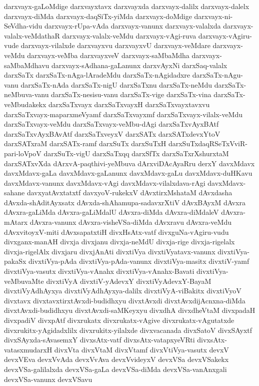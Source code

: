 {darxvayx-gaLoMdige
darxvayxtavx
darxvayxda
darxvayx-dalilx
darxvayx-dalelx
darxvayx-diMda
darxvayx-daqSiTx-yiMda
darxvayx-doMdige
darxvayx-ni-SeVdha-vidu
darxvayx-rUpa-vAda
darxvayx-vanunx
darxvayx-valalxda
darxvayx-valalx-veMdathaR
darxvayx-valalx-veMdu
darxvayx-vAgi-ruva
darxvayx-vAgiru-vude
darxvayx-vilalxde
darxvayxvu
darxvayxvU
darxvayx-veMdare
darxvayx-veMdu
darxvayx-veMba
darxvayxveV
darxvayx-saMbaMdha
darxvayx-saMbaMdhavu
darxvayx-sAdhana-gaLanunx
darxvAyxNi
darxSaq-valalx
darxSaTx
darxSaTx-nAga-lAradeMdu
darxSaTx-nAgidadxre
darxSaTx-nAgu-vanu
darxSaTx-nAda
darxSaTx-nigU
darxSaTxnu
darxSaTx-neMdu
darxSaTx-neMbuva-vanu
darxSaTx-nesisu-vanu
darxSaTx-vige
darxSaTx-vina
darxSaTx-veMbudakekx
darxSaTxvayx
darxSaTxvayxH
darxSaTxvayxtavxvu
darxSaTxvayx-maparxmeVyamf
darxSaTxvayxmf
darxSaTxvayx-vilalx-veMdu
darxSaTxvayx-veMdu
darxSaTxvayx-veMbu-dAgi
darxSaTxvAyxBAtf
darxSaTxvAyxBAvAtf
darxSaTxveyxV
darxSATx
darxSATxdevxYtoV
darxSATxraM
darxSATx-ramf
darxSuTx
darxSuTxH
darxSuTxdaqRSeTxVviR-pari-loVpoV
darxSuTx-vigU
darxSaTxqq
darxSfTx
darxSaTxrXshurxtaM
darxSATxvXda
dArxvA-paqthivi-yeMbuva
dArxviDAcAyaRru
derxY
davxMdavx
davxMdavx-gaLa
davxMdavx-gaLanunx
davxMdavx-gaLu
davxMdavx-duHKavu
davxMdavx-vanunx
davxMdavx-vAgi
davxMdavx-vilalxdava-rAgi
davxMdavx-sahane
davxyatAvxtatxtf
davxyoV-rukekxV
dAvxtirxMshataM
dAvxdasha
dAvxda-shAditAyxsatx
dAvxda-shAhamupa-sadavxrXtiV
dAvxBAyxM
dAvxra
dAvxra-gaLiMda
dAvxra-gaLiMdalU
dAvxra-diMda
dAvxra-diMdaleV
dAvxra-mAtarx
dAvxra-vanunx
dAvxra-visheVSa-diMda
dAvxravu
dAvxra-veMdu
dAvxvitoyxV-miti
dAvxsapatxtiH
divxHsAtx-vatf
divxguNa-vAgiru-vudu
divxganx-manAH
divxja
divxjanu
divxja-neMdU
divxja-rige
divxja-rigelalx
divxja-rigelAlx
divxjaru
divxjAnAti
divxtiVya
divxtiVyatavx-vanunx
divxtiVya-pakaSx
divxtiVya-pAda
divxtiVya-pAda-vanunx
divxtiVya-masitx
divxtiV-yamf
divxtiVya-vasutx
divxtiVya-vAnahx
divxtiVya-vAnahx-Bavati
divxtiVya-veMbuvaMte
divxtiVyA
divxtiV-yAdevxY
divxtiVyAdevxY-BayaM
divxtiVyAdhAyxya
divxtiVyAdhAyxya-dalilx
divxtiVyA-viBakitx
divxtiVyoV
divxtavx
divxtavxtirxtAvxdi-budidhxyu
divxtAvxdi
divxtAvxdijAcnxna-diMda
divxtAvxdi-budidhxyu
divxtAvxdi-saMKeyxyu
divxdhA
divxdheVtaM
divxpadaH
divxpadiV
divxpAtf
divxrukatx
divxrukatx-vAgive
divxrukatx-vAgutatxde
divxrukitx-yAgidadxlilx
divxrukitx-yilalxde
divxvacanada
divxSatoV
divxSAyxtf
divxSAyxda-sAvasemxY
divxsAtx-vatf
divxsAtx-vatapxyeVRti
divxsAtx-vatasxmudarxH
divxVta
divxVtaM
divxVtamf
divxVtiVya-vasutx
devxV
devxVEva
devxVvAda
devxVvAva
devxVvideyxV
devxVSa
devxVSakekx
devxVSa-galilalxda
devxVSa-gaLa
devxVSa-diMda
devxVSa-vanAnxgali
devxVSa-vanunx
devxVSavu
}
